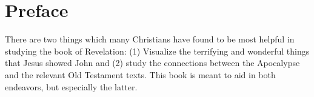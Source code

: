 \ClearShipoutPicture
{}

\blankpage
\clearpage
\clearpage

\begin{KeepFromToc}
\tableofcontents
\end{KeepFromToc}
\clearpage
\listoffigures
\clearpage

\chapter{Preface}
There are two things which many Christians have found to be most helpful in studying the book of Revelation: (1) Visualize the terrifying and wonderful things that Jesus showed John and (2) study the connections between the Apocalypse and the relevant Old Testament texts. This book is meant to aid in both endeavors, but especially the latter. \\

